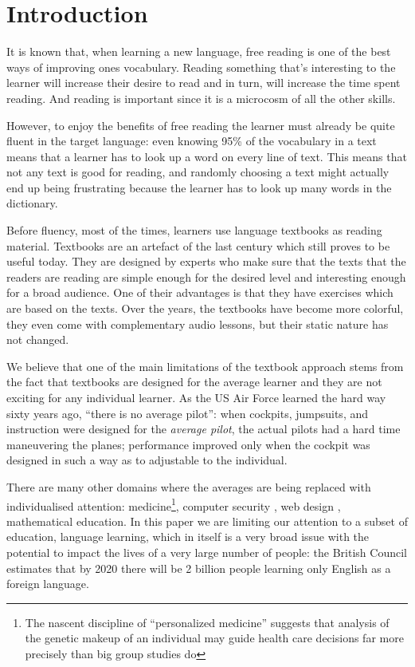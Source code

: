 
\section{Introduction}
It is known that, when learning a new language, free reading is one of the best ways of improving ones vocabulary. Reading something that's interesting to the learner will increase their desire to read and in turn, will increase the time spent reading. And reading is important since it is a microcosm of all the other skills. \cite{mccarthy1999-microcosm} 

However, to enjoy the benefits of free reading the learner must already be quite fluent in the target language: even knowing 95\% of the vocabulary in a text means that a learner has to look up a word on every line of text. \cite{Hirsh92-vocab-size} This means that not any text is good for reading, and randomly choosing a text might actually end up being frustrating because the learner has to look up many words in the dictionary.

Before fluency, most of the times, learners use language textbooks as reading material. Textbooks are an artefact of the last century which still proves to be useful today. They are designed by experts who make sure that the texts that the readers are reading are simple enough for the desired level and interesting enough for a broad audience. One of their advantages is that they have exercises which are based on the texts. Over the years, the textbooks have become more colorful, they even come with complementary audio lessons, but their static nature has not changed.

We believe that one of the main limitations of the textbook approach stems from the fact that textbooks are designed for the average learner and they are not exciting for any individual learner. As the US Air Force learned the hard way sixty years ago, ``there is no average pilot'': when cockpits, jumpsuits, and instruction were designed for the {\em average pilot}, the actual pilots had a hard time maneuvering the planes; performance improved only when the cockpit was designed in such a way as to adjustable to the individual. 

There are many other domains where the averages are being replaced with individualised attention: medicine\footnote{The nascent discipline of ``personalized medicine'' suggests that analysis of the genetic makeup of an individual may guide health care decisions far more precisely than big group studies do}, computer security , web design\cite{Reinecke13-CulturalAdaptation} , mathematical education\cite{Polozov15-AdaptableMath}. In this paper we are limiting our attention to a subset of education, language learning, which in itself is a very broad issue with the potential to impact the lives of a very large number of people: the British Council estimates that by 2020 there will be 2 billion people learning only English as a foreign language. 

